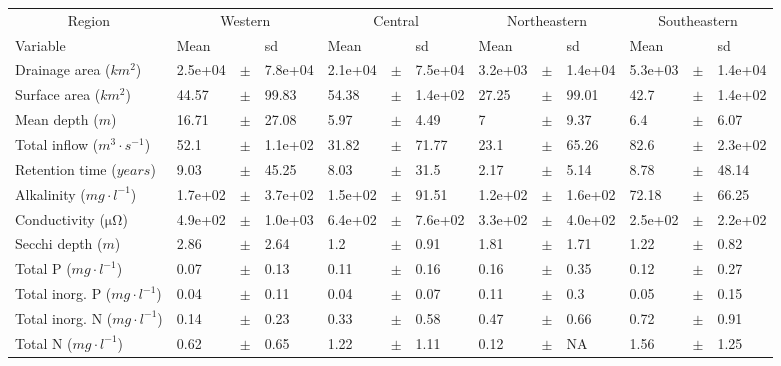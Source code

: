 \documentclass{article}
\begin{document}
\begin{landscape}
\begin{table}[!h]
\centering{}

\begin{tabular}{lllllllllllll}
\toprule
\multicolumn{1}{c}{Region} & \multicolumn{3}{c}{Western} & \multicolumn{3}{c}{Central} & \multicolumn{3}{c}{Northeastern} & \multicolumn{3}{c}{Southeastern} \\ \cmidrule(l{2pt}r{2pt}){1-1} \cmidrule(l{2pt}r{2pt}){2-4} \cmidrule(l{2pt}r{2pt}){5-7} \cmidrule(l{2pt}r{2pt}){8-10} \cmidrule(l{2pt}r{2pt}){11-13}
Variable & Mean &   & sd & Mean &   & sd & Mean &   & sd & Mean &   & sd\\
\midrule
Drainage area ($km^{2}$) & 2.5e+04 & $\pm$ & 7.8e+04 & 2.1e+04 & $\pm$ & 7.5e+04 & 3.2e+03 & $\pm$ & 1.4e+04 & 5.3e+03 & $\pm$ & 1.4e+04\\
Surface area ($km^{2}$) & 44.57 & $\pm$ & 99.83 & 54.38 & $\pm$ & 1.4e+02 & 27.25 & $\pm$ & 99.01 & 42.7 & $\pm$ & 1.4e+02\\
Mean depth ($m$) & 16.71 & $\pm$ & 27.08 & 5.97 & $\pm$ & 4.49 & 7 & $\pm$ & 9.37 & 6.4 & $\pm$ & 6.07\\
Total inflow ($m^{3} \cdot s^{-1}$) & 52.1 & $\pm$ & 1.1e+02 & 31.82 & $\pm$ & 71.77 & 23.1 & $\pm$ & 65.26 & 82.6 & $\pm$ & 2.3e+02\\
Retention time ($years$) & 9.03 & $\pm$ & 45.25 & 8.03 & $\pm$ & 31.5 & 2.17 & $\pm$ & 5.14 & 8.78 & $\pm$ & 48.14\\
\addlinespace
Alkalinity ($mg \cdot l^{-1}$) & 1.7e+02 & $\pm$ & 3.7e+02 & 1.5e+02 & $\pm$ & 91.51 & 1.2e+02 & $\pm$ & 1.6e+02 & 72.18 & $\pm$ & 66.25\\
Conductivity ($\si{\micro\ohm}$) & 4.9e+02 & $\pm$ & 1.0e+03 & 6.4e+02 & $\pm$ & 7.6e+02 & 3.3e+02 & $\pm$ & 4.0e+02 & 2.5e+02 & $\pm$ & 2.2e+02\\
Secchi depth ($m$) & 2.86 & $\pm$ & 2.64 & 1.2 & $\pm$ & 0.91 & 1.81 & $\pm$ & 1.71 & 1.22 & $\pm$ & 0.82\\
Total P ($mg \cdot l^{-1}$) & 0.07 & $\pm$ & 0.13 & 0.11 & $\pm$ & 0.16 & 0.16 & $\pm$ & 0.35 & 0.12 & $\pm$ & 0.27\\
Total inorg. P ($mg \cdot l^{-1}$) & 0.04 & $\pm$ & 0.11 & 0.04 & $\pm$ & 0.07 & 0.11 & $\pm$ & 0.3 & 0.05 & $\pm$ & 0.15\\
\addlinespace
Total inorg. N ($mg \cdot l^{-1}$) & 0.14 & $\pm$ & 0.23 & 0.33 & $\pm$ & 0.58 & 0.47 & $\pm$ & 0.66 & 0.72 & $\pm$ & 0.91\\
Total N ($mg \cdot l^{-1}$) & 0.62 & $\pm$ & 0.65 & 1.22 & $\pm$ & 1.11 & 0.12 & $\pm$ & NA & 1.56 & $\pm$ & 1.25\\

\end{tabular}
\end{table}
\end{landscape}
\end{document}
